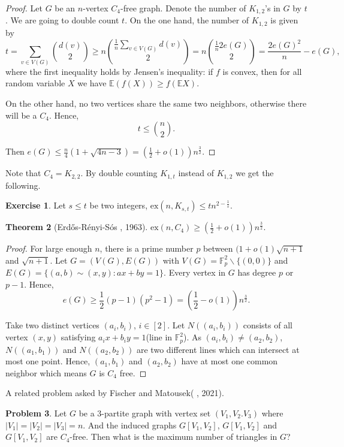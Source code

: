 \documentclass{article}
\newtheorem{theorem}{Theorem}[section]
\theoremstyle{definition}
\newtheorem{exercise}[theorem]{Exercise}
\newtheorem{problem}[theorem]{Problem}
\newcommand{\ex}{\mathrm{ex}}
\def\Erdos{Erd\H{o}s}
\begin{document}
\begin{proof}
    Let $G$ be an $n$-vertex $C_4$-free graph. Denote the number of $K_{1,2}$'s in $G$ by $t$. We are going to double count $t$. On the one hand, the number of $K_{1,2}$ is given by  
    $$t={\underset{v\in V(G)}\sum} \binom{d(v)}{2}\geq n\binom{\frac{1}{n}\underset{v\in V(G)}\sum d(v)}{2}=n\binom{\frac{1}{n}2e(G)}{2}=\frac{2e(G)^2}{n}-e(G),$$
    where the first inequality holds by Jensen's inequality: if $f$ is convex, then for all random variable $X$ we have $\mathbb{E}(f(X))\geq f(\mathbb{E}X)$.\par
    
    On the other hand, no two vertices share the same two neighbors, otherwise there will be a $C_4$. Hence,
    $$t\leq \binom{n}{2}.$$\par
    Then $e(G)\leq \frac{n}{4}(1+\sqrt{4n-3})=(\frac{1}{2}+o(1))n^{\frac{3}{2}}.$
    \end{proof}
Note that $C_4=K_{2,2}$. By double counting $K_{1,t}$ instead of $K_{1,2}$ we get the following.
\begin{exercise}\label{kstg}
    Let $s\leq t$ be two integers, $\ex(n,K_{s,t})\leq tn^{2-\frac{1}{s}}.$
\end{exercise}

\begin{theorem}[\Erdos{}-R\'enyi-S\'os \cite{MR0159319}, 1963]
     $\ex(n,C_4)\geq (\frac{1}{2}+o(1))n^{\frac{3}{2}}.$
\end{theorem}
\begin{proof}
    For large enough $n$, there is a prime number $p$ between $(1+o(1)\sqrt{n+1}$ and $\sqrt{n+1}$. Let $G=(V(G),E(G))$ with $V(G)=\mathbb{F}_p^2\backslash\{(0,0)\}$ and $E(G)=\{(a,b)\sim (x,y):ax+by=1\}$. Every vertex in $G$ has degree $p$ or $p-1$.
Hence, 
$$e(G)\geq \frac{1}{2}(p-1)(p^2-1)=(\frac{1}{2}-o(1))n^{\frac{3}{2}}.$$\par
Take two distinct vertices $(a_i,b_i)$, $i\in [2]$. Let $N((a_i,b_i))$ consists of all vertex $(x,y)$ satisfying $a_ix+b_iy=1$(line in $\mathbb{F}_p^2$). As $(a_i,b_i)\neq (a_2,b_2)$, $N((a_1,b_1))$ and $N((a_2,b_2))$ are two different lines which can intersect at most one point.
Hence, $(a_1,b_1)$ and $(a_2,b_2)$ have at most one common neighbor which means $G$ is $C_4$ free.
\end{proof}
A related problem asked by Fischer and Matousek(\cite{fischer2001lower} , 2021).
\begin{problem} \label{ct}
    Let  $G$ be a $3$-partite graph with vertex set $(V_1,V_2.V_3)$ where $|V_1|=|V_2|=|V_3|=n$. And the induced graphs $G[V_1,V_2]$, $G[V_1,V_2]$ and $G[V_1,V_2]$ are $C_4$-free. Then what is the maximum number of triangles in $G$?
\end{problem}
\end{document}
